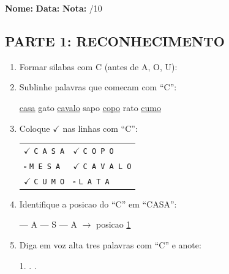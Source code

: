 \begin{exercicio}
\noindent\textbf{Nome:} \underline{\hspace{3.2cm}} \quad \textbf{Data:} \underline{\hspace{1.6cm}} \quad \textbf{Nota:} \underline{\hspace{0.9cm}}/10

\subsection*{PARTE 1: RECONHECIMENTO}

\begin{enumerate}
  \item Formar silabas com C (antes de A, O, U):
  \begin{center}
   \quad {} \quad {}
  \end{center}

  \item Sublinhe palavras que comecam com ``C'':
  \begin{center}
  \uline{casa} \quad gato \quad \uline{cavalo} \quad sapo \quad \uline{copo} \quad rato \quad \uline{cumo}
  \end{center}

  \item Coloque $\checkmark$ nas linhas com ``C'':
  \begin{center}
  \begin{tabular}{ll}
  $\checkmark$ \texttt{C A S A} & $\checkmark$ \texttt{C O P O} \\
  $\square$ \texttt{M E S A} & $\checkmark$ \texttt{C A V A L O} \\
  $\checkmark$ \texttt{C U M O} & $\square$ \texttt{L A T A}
  \end{tabular}
  \end{center}

  \item Identifique a posicao do ``C'' em ``CASA'':
  \begin{center}
   --- A --- S --- A $\rightarrow$ posicao \underline{1}
  \end{center}

  \item Diga em voz alta tres palavras com ``C'' e anote:
  \begin{center}
  1. \underline{\hspace{4cm}} . \underline{\hspace{4cm}} . \underline{\hspace{4cm}}
  \end{center}
\end{enumerate}


\end{exercicio}
